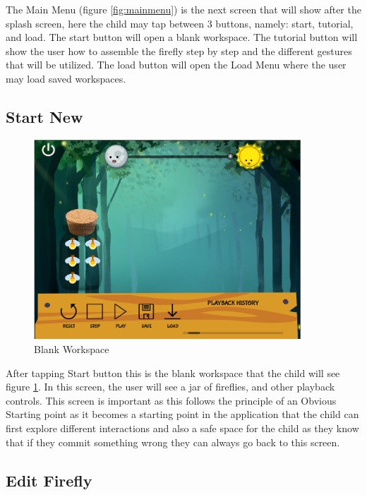 The Main Menu (figure \ref{fig:mainmenu}) is the next screen that will show after the splash screen, here the child may tap between 3 buttons, namely: start, tutorial, and load. The start button will open a blank workspace. The tutorial button will show the user how to assemble the firefly step by step and the different gestures that will be utilized. The load button will open the Load Menu where the user may load saved workspaces.

\subsection{Start New}

\begin{figure}[H]
    \centering
    \includegraphics[width=10cm]{figures/BlankSpace.png}
    \caption{Blank Workspace}
    \label{fig:blankworkspace}
\end{figure}

After tapping Start button this is the blank workspace that the child will see figure \ref{fig:blankworkspace}. In this screen, the user will see a jar of fireflies, and other playback controls. This screen is important as this follows the principle of an Obvious Starting point as it becomes a starting point in the application that the child can first explore different interactions and also a safe space for the child as they know that if they commit something wrong they can always go back to this screen.

\subsection{Edit Firefly}

